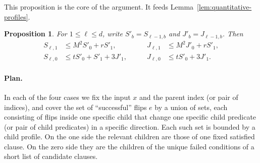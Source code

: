\documentclass[11pt]{article}
\newtheorem{proposition}[theorem]{Proposition}
\theoremstyle{definition}
\theoremstyle{remark}
\begin{document}
This proposition is the core of the argument. It feeds
Lemma~\ref{lem:quantitative-profiles}.

\begin{proposition}\label{prop:recurrences}
For $1\leq \ell\leq d$, write
$S'_b=S_{\ell-1,b}$ and $J'_b=J_{\ell-1,b}$.  Then
\begin{equation}\label{eq:recurrences}
\begin{aligned}
 S_{\ell,1}&\leq M^2S'_0+rS'_1,
 &\qquad J_{\ell,1}&\leq M^2J'_0+rS'_1,\\
 S_{\ell,0}&\leq tS'_0+S'_1+3J'_1,
 &\qquad J_{\ell,0}&\leq tS'_0+3J'_1.
\end{aligned}
\end{equation}
\end{proposition}

\paragraph{Plan.}
In each of the four cases we fix the input \(x\) and the parent index (or pair
of indices), and cover the set of ``successful'' flips \(e\) by a union of
sets, each consisting of flips inside one specific child that change one
specific child predicate (or pair of child predicates) in a specific
direction. Each such set is bounded by a child profile. On the one side the
relevant children are those of one fixed satisfied clause. On the zero side
they are the children of the unique failed conditions of a short list of
candidate clauses.
\end{document}
